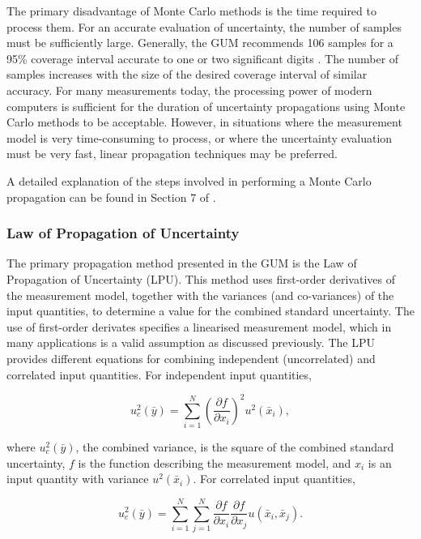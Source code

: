 \documentclass[../thesis/thesis.tex]{subfiles}
\begin{document}
\begin{refsection}
The primary disadvantage of Monte Carlo methods is the time required to process them. For an accurate evaluation of uncertainty, the number of samples must be sufficiently large. Generally, the GUM recommends 106 samples for a 95\% coverage interval accurate to one or two significant digits \cite[7.2.1]{GUM_S1}. The number of samples increases with the size of the desired coverage interval of similar accuracy. For many measurements today, the processing power of modern computers is sufficient for the duration of uncertainty propagations using Monte Carlo methods to be acceptable. However, in situations where the measurement model is very time-consuming to process, or where the uncertainty evaluation must be very fast, linear propagation techniques may be preferred.

A detailed explanation of the steps involved in performing a Monte Carlo propagation can be found in Section 7 of \cite{GUM_S1}.

\subsubsection{Law of Propagation of Uncertainty}

The primary propagation method presented in the GUM is the Law of Propagation of Uncertainty (LPU). This method uses first-order derivatives of the measurement model, together with the variances (and co-variances) of the input quantities, to determine a value for the combined standard uncertainty. The use of first-order derivates specifies a linearised measurement model, which in many applications is a valid assumption as discussed previously. The LPU provides different equations for combining independent (uncorrelated) and correlated input quantities. For independent input quantities,

\begin{equation}
u^2_c(\bar{y}) = \sum_{i=1}^{N}(\frac{\partial f}{\partial x_i})^2 u^2(\bar{x}_i),
\end{equation}

where $u^2_c(\bar{y})$, the combined variance, is the square of the combined standard uncertainty, $f$ is the function describing the measurement model, and $x_i$ is an input quantity with variance $u^2(\bar{x}_i)$. For correlated input quantities,

\begin{equation}
u^2_c(\bar{y}) = \sum_{i=1}^{N}\sum_{j=1}^{N} \frac{\partial f}{\partial x_i}\frac{\partial f}{\partial x_j} u(\bar{x}_i,\bar{x}_j).
\label{ch3_eqn_lpu_corr}
\end{equation}


\end{refsection}
\end{document}

